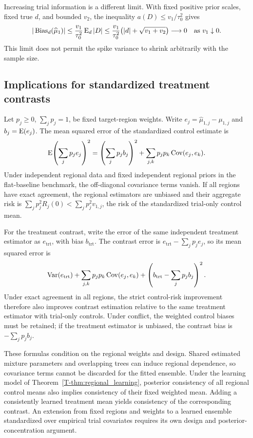 Increasing trial information is a different limit. With fixed positive prior scales, fixed true $d$, and bounded $v_2$, the inequality $a(D)\leq v_1/\tau_0^2$ gives
\begin{equation}\label{eq:regional_increasing_trial}
|\operatorname{Bias}_d(\widehat\mu_1)|
\leq\frac{v_1}{\tau_0^2}\operatorname{E}_d|D|
\leq\frac{v_1}{\tau_0^2}\bigl(|d|+\sqrt{v_1+v_2}\bigr)
\longrightarrow0\quad\text{as }v_1\downarrow0.
\end{equation}
This limit does not permit the spike variance to shrink arbitrarily with the sample size.

\subsection{Implications for standardized treatment contrasts}\label{sec:C.4}
Let $p_j\geq0$, $\sum_jp_j=1$, be fixed target-region weights. Write $e_j=\widehat\mu_{1,j}-\mu_{1,j}$ and $b_j=\operatorname{E}(e_j)$. The mean squared error of the standardized control estimate is
\begin{equation}\label{eq:regional_aggregate_risk}
\operatorname{E}\!\left(\sum_jp_je_j\right)^2
=\left(\sum_jp_jb_j\right)^2+
\sum_{j,k}p_jp_k\operatorname{Cov}(e_j,e_k).
\end{equation}
Under independent regional data and fixed independent regional priors in the flat-baseline benchmark, the off-diagonal covariance terms vanish. If all regions have exact agreement, the regional estimators are unbiased and their aggregate risk is $\sum_jp_j^2R_j(0)<\sum_jp_j^2v_{1,j}$, the risk of the standardized trial-only control mean.

For the treatment contrast, write the error of the same independent treatment estimator as $e_{\mathrm{trt}}$, with bias $b_{\mathrm{trt}}$. The contrast error is $e_{\mathrm{trt}}-\sum_jp_je_j$, so its mean squared error is
\[
\operatorname{Var}(e_{\mathrm{trt}})+\sum_{j,k}p_jp_k\operatorname{Cov}(e_j,e_k)
+\left(b_{\mathrm{trt}}-\sum_jp_jb_j\right)^2.
\]
Under exact agreement in all regions, the strict control-risk improvement therefore also improves contrast estimation relative to the same treatment estimator with trial-only controls. Under conflict, the weighted control biases must be retained; if the treatment estimator is unbiased, the contrast bias is $-\sum_jp_jb_j$.

These formulas condition on the regional weights and design. Shared estimated mixture parameters and overlapping trees can induce regional dependence, so covariance terms cannot be discarded for the fitted ensemble. Under the learning model of Theorem~\ref{T-thm:regional_learning}, posterior consistency of all regional control means also implies consistency of their fixed weighted mean. Adding a consistently learned treatment mean yields consistency of the corresponding contrast. An extension from fixed regions and weights to a learned ensemble standardized over empirical trial covariates requires its own design and posterior-concentration argument.

